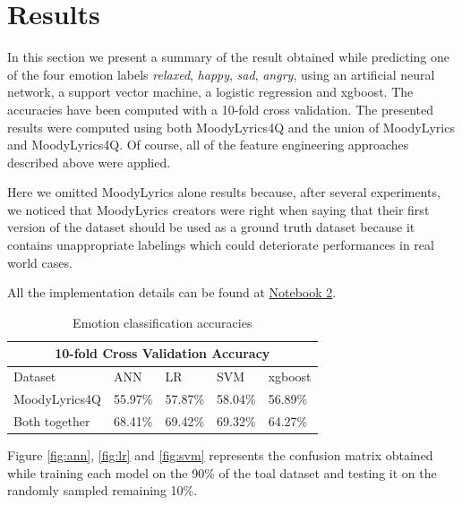 \section{Results}
In this section we present a summary of the result obtained while predicting one of the four emotion labels \textit{relaxed}, \textit{happy}, \textit{sad}, \textit{angry}, using an artificial neural network, a support vector machine, a logistic regression and xgboost. The accuracies have been computed with a 10-fold cross validation. The presented results were computed using both MoodyLyrics4Q and the union of MoodyLyrics and MoodyLyrics4Q. Of course, all of the feature engineering approaches described above were applied.

Here we omitted MoodyLyrics alone results because, after several experiments, we noticed that MoodyLyrics creators were right when saying that their first version of the dataset should be used as a ground truth dataset because it contains unappropriate labelings which could deteriorate performances in real world cases.

All the implementation details can be found at \href{https://github.com/sgiammy/emotion-patterns-in-music-playlists/blob/master/Notebook/2_Advanced_Feature_Engineering.ipynb}{Notebook 2}.

\begin{table}[H]
\centering
\begin{tabular}{ |p{3cm}||p{1.5cm}|p{1.5cm}|p{1.5cm}|p{1.5cm}|  }
 \hline
 \multicolumn{5}{|c|}{10-fold Cross Validation Accuracy} \\
 \hline
 Dataset & ANN & LR &SVM & xgboost\\
 \hline
MoodyLyrics4Q  & 55.97\%    &57.87\% &  58.04\% & 56.89\%\\
Both together &   68.41\%  & 69.42\%   &69.32\% &64.27\%\\
\hline
\end{tabular}
\caption{Emotion classification accuracies} \label{tab:comparison}
\end{table}

Figure \ref{fig:ann}, \ref{fig:lr} and \ref{fig:svm} represents the confusion matrix obtained while training each model on the 90\% of the toal dataset and testing it on the randomly sampled remaining 10\%.


